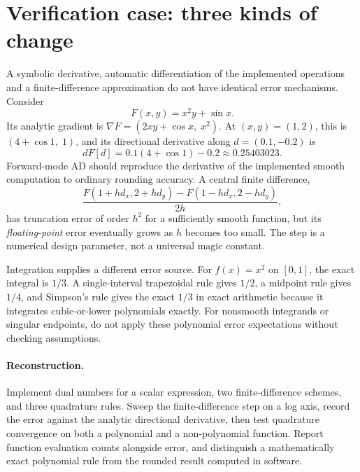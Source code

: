 \clearpage
\section*{Verification case: three kinds of change}
\noindent A symbolic derivative, automatic differentiation of the
implemented operations and a finite-difference approximation do not
have identical error mechanisms. Consider
\[
F(x,y)=x^2y+\sin x.
\]
Its analytic gradient is
\(\nabla F=(2xy+\cos x,\;x^2)\).
At \((x,y)=(1,2)\), this is
\((4+\cos1,\;1)\), and its directional derivative along
\(d=(0.1,-0.2)\) is
\[
dF[d]=0.1(4+\cos1)-0.2\approx0.25403023.
\]
Forward-mode AD should reproduce the derivative of the implemented
smooth computation to ordinary rounding accuracy. A central
finite difference,
\[
\frac{F(1+hd_x,2+hd_y)-F(1-hd_x,2-hd_y)}{2h},
\]
has truncation error of order \(h^2\) for a sufficiently smooth
function, but its \emph{floating-point} error eventually grows as
\(h\) becomes too small. The step is a numerical design parameter,
not a universal magic constant.

Integration supplies a different error source. For \(f(x)=x^2\)
on \([0,1]\), the exact integral is \(1/3\). A single-interval
trapezoidal rule gives \(1/2\), a midpoint rule gives \(1/4\),
and Simpson's rule gives the exact \(1/3\) in exact arithmetic
because it integrates cubic-or-lower polynomials exactly.
For nonsmooth integrands or singular endpoints, do not apply these
polynomial error expectations without checking assumptions.

\paragraph{Reconstruction.}
Implement dual numbers for a scalar expression, two finite-difference
schemes, and three quadrature rules. Sweep the finite-difference step
on a log axis, record the error against the analytic directional
derivative, then test quadrature convergence on both a polynomial
and a non-polynomial function. Report function evaluation counts
alongside error, and distinguish a mathematically exact polynomial
rule from the rounded result computed in software.
